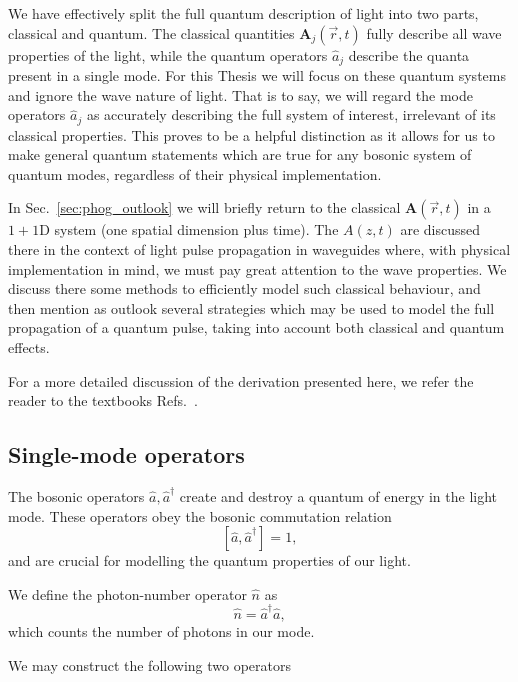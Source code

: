 We have effectively split the full quantum description of light into two parts, classical and quantum. The classical quantities $\bm{A}_j\left(\overrightarrow{r}, t\right)$ fully describe all wave properties of the light, while the quantum operators $\hat{a}_j$ describe the quanta present in a single mode. For this Thesis we will focus on these quantum systems and ignore the wave nature of light. That is to say, we will regard the mode operators $\hat{a}_j$ as accurately describing the full system of interest, irrelevant of its classical properties. This proves to be a helpful distinction as it allows for us to make general quantum statements which are true for any bosonic system of quantum modes, regardless of their physical implementation.

In Sec.~\ref{sec:phog_outlook} we will briefly return to the classical $\bm{A}\left(\overrightarrow{r}, t\right)$ in a $1+1$D system (one spatial dimension plus time). The $A\left(z, t\right)$ are discussed there in the context of light pulse propagation in waveguides where, with physical implementation in mind, we must pay great attention to the wave properties. We discuss there some methods to efficiently model such classical behaviour, and then mention as outlook several strategies which may be used to model the full propagation of a quantum pulse, taking into account both classical and quantum effects.

For a more detailed discussion of the derivation presented here, we refer the reader to the textbooks Refs.~\cite{Leonhardt2010, Walls_Millburn_Textbook, Gerry_Knight_Textbook}.


\FloatBarrier
\subsection{Single-mode operators}
The bosonic operators $\hat{a}, \hat{a}^\dagger$ create and destroy a quantum of energy in the light mode. These operators obey the bosonic commutation relation
\begin{equation}
\left[ \hat{a}, \hat{a}^\dagger \right] = 1,
\end{equation}
and are crucial for modelling the quantum properties of our light. 

We define the photon-number operator $\hat{n}$ as 
\begin{equation}
\hat{n} = \hat{a}^\dagger \hat{a},
\end{equation}
which counts the number of photons in our mode.

We may construct the following two operators

